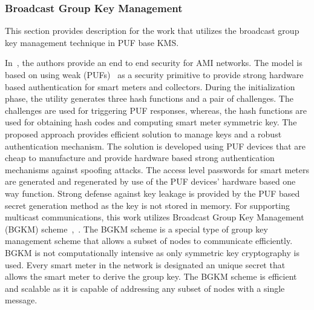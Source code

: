 \subsubsection{Broadcast Group Key Management} This section provides description for the work that utilizes the broadcast group key management technique in PUF base KMS. 
\par In~\cite{Nabeel15}, the authors provide an end to end security for AMI networks. The model is based on using weak (PUFs)~\cite{Nabeel2012} as a security primitive to provide strong hardware based authentication for smart meters and collectors. During the initialization phase, the utility generates three hash functions and a pair of challenges. The challenges are used for triggering PUF responses, whereas, the hash functions are used for obtaining hash codes and computing smart meter symmetric key. The proposed approach provides efficient solution to manage keys and a robust authentication mechanism. The solution is developed using PUF devices that are cheap to manufacture and provide hardware based strong authentication mechanisms against spoofing attacks. The access level passwords for smart meters are generated and regenerated by use of the PUF devices' hardware based one way function. Strong defense against key leakage is provided by the PUF based secret generation method as the key is not stored in memory. For supporting multicast communications, this work utilizes Broadcast Group Key Management (BGKM) scheme~\cite{Zou08},~\cite{Shang10}. The BGKM scheme is a special type of group key management scheme that allows a subset of nodes to communicate efficiently. BGKM is not computationally intensive as only symmetric key cryptography is used. Every smart meter in the network is designated an unique secret that allows the smart meter to derive the group key. The BGKM scheme is efficient and scalable as it is capable of addressing any subset of nodes with a single message.

